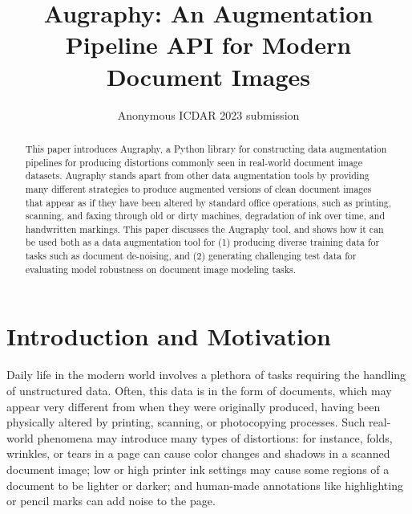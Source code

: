\documentclass[runningheads]{llncs}
\begin{document}
\title{Augraphy: An Augmentation Pipeline API for Modern Document Images}
%
%

\author{Anonymous ICDAR 2023 submission}

\maketitle

\begin{abstract}
This paper introduces Augraphy, a Python library for constructing data augmentation pipelines for producing distortions commonly seen in real-world document image datasets.
Augraphy stands apart from other data augmentation tools by providing many different strategies to produce augmented versions of clean document images that appear as if they have been altered by standard office operations, such as printing, scanning, and faxing through old or dirty machines, degradation of ink over time, and handwritten markings.
This paper discusses the Augraphy tool, and shows how it can be used both as a data augmentation tool for (1) producing diverse training data for tasks such as document de-noising, and (2) generating challenging test data for evaluating model robustness on document image modeling tasks.

\end{abstract}

\section{Introduction and Motivation}
Daily life in the modern world involves a plethora of tasks requiring the handling of unstructured data.
Often, this data is in the form of documents, which may appear very different from when they were originally produced, having been physically altered by printing, scanning, or photocopying processes.
Such real-world phenomena may introduce many types of distortions: for instance, folds, wrinkles, or tears in a page can cause color changes and shadows in a scanned document image; low or high printer ink settings may cause some regions of a document to be lighter or darker; and human-made annotations like highlighting or pencil marks can add noise to the page.
\end{document}
